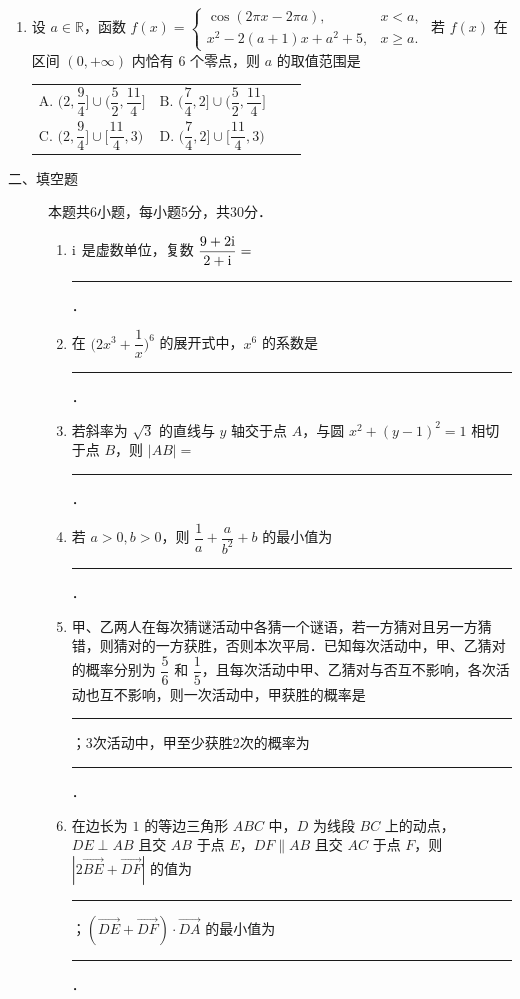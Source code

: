 \begin{description}
\begin{enumerate}[leftmargin=5pt]
        \item 设 $a\in\mathbb{R}$，函数 $f(x)=\begin{cases}\cos(2\pi x-2\pi a),&x<a,\\x^2-2(a+1)x+a^2+5,&x\geqslant a.\end{cases}$ 若 $f(x)$ 在区间 $(0,+\infty)$ 内恰有 $6$ 个零点，则 $a$ 的取值范围是
       
        {\centering\begin{tabular*}{\linewidth}{@{}@{\extracolsep{\fill}}llll@{}}
          \(\text{A. }\bigl(2,\dfrac{9}{4}\bigr]\cup\bigl(\dfrac{5}{2},\dfrac{11}{4}\bigr]\)  & \(\text{B. }\bigl(\dfrac{7}{4},2\bigr]\cup\bigl(\dfrac{5}{2},\dfrac{11}{4}\bigr]\) \\
          \(\text{C. }\bigl(2,\dfrac{9}{4}\bigr]\cup\bigl[\dfrac{11}{4},3\bigr)\)  & \(\text{D. }\bigl(\dfrac{7}{4},2\bigr]\cup\bigl[\dfrac{11}{4},3\bigr)\)
        \end{tabular*}\par}
    \end{enumerate}
\end{description}

\begin{description}
    \item[二、填空题] 本题共6小题，每小题5分，共30分．
    \begin{enumerate}[leftmargin=5pt]
      \addtocounter{enumi}{+9}
        \item $\mathrm{i}$ 是虚数单位，复数 $\dfrac{9+2\mathrm{i}}{2+\mathrm{i}}=$ \rule[-0.3ex]{3em}{0.4pt}．
        \item 在 $\bigl(2x^3+\dfrac{1}{x}\bigr)^6$ 的展开式中，$x^6$ 的系数是 \rule[-0.3ex]{3em}{0.4pt}．
        \item 若斜率为 $\sqrt{3}$ 的直线与 $y$ 轴交于点 $A$，与圆 $x^2+(y-1)^2=1$ 相切于点 $B$，则 $|AB|=$ \rule[-0.3ex]{3em}{0.4pt}．
        \item 若 $a>0,b>0$，则 $\dfrac{1}{a}+\dfrac{a}{b^2}+b$ 的最小值为 \rule[-0.3ex]{3em}{0.4pt}．
        \item 甲、乙两人在每次猜谜活动中各猜一个谜语，若一方猜对且另一方猜错，则猜对的一方获胜，否则本次平局．已知每次活动中，甲、乙猜对的概率分别为 $\dfrac{5}{6}$ 和 $\dfrac{1}{5}$，且每次活动中甲、乙猜对与否互不影响，各次活动也互不影响，则一次活动中，甲获胜的概率是 \rule[-0.3ex]{3em}{0.4pt}；3次活动中，甲至少获胜2次的概率为 \rule[-0.3ex]{3em}{0.4pt}．
        \item 在边长为 $1$ 的等边三角形 $ABC$ 中，$D$ 为线段 $BC$ 上的动点，$DE\perp AB$ 且交 $AB$ 于点 $E$，$DF\parallel AB$ 且交 $AC$ 于点 $F$，则 $|2\overrightarrow{BE}+\overrightarrow{DF}|$ 的值为 \rule[-0.3ex]{3em}{0.4pt}；$(\overrightarrow{DE}+\overrightarrow{DF})\cdot\overrightarrow{DA}$ 的最小值为 \rule[-0.3ex]{3em}{0.4pt}．
    \end{enumerate}
\end{description}

